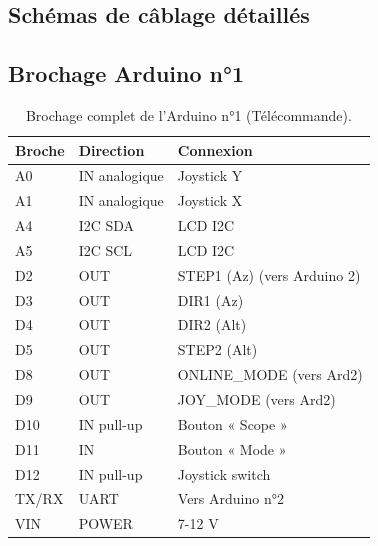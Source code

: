 \documentclass[12pt,a4paper]{report}
\begin{document}
\begin{enumerate}
\begin{enumerate}
\clearpage

\chapter{Schémas de câblage détaillés}

\section{Brochage Arduino n°1}
\begin{table}[H]
    \centering
    \caption{Brochage complet de l'Arduino n°1 (Télécommande).}
    \begin{tabular}{|l|l|l|}
        \hline
        \textbf{Broche} & \textbf{Direction} & \textbf{Connexion} \\
        \hline
        A0 & IN analogique & Joystick Y \\
        A1 & IN analogique & Joystick X \\
        A4 & I2C SDA & LCD I2C \\
        A5 & I2C SCL & LCD I2C \\
        D2 & OUT & STEP1 (Az) (vers Arduino 2) \\
        D3 & OUT & DIR1 (Az) \\
        D4 & OUT & DIR2 (Alt) \\
        D5 & OUT & STEP2 (Alt) \\
        D8 & OUT & ONLINE\_MODE (vers Ard2) \\
        D9 & OUT & JOY\_MODE (vers Ard2) \\
        D10 & IN pull-up & Bouton « Scope » \\
        D11 & IN & Bouton « Mode » \\
        D12 & IN pull-up & Joystick switch \\
        TX/RX & UART & Vers Arduino n°2 \\
        VIN & POWER & 7-12 V \\
        \hline
    \end{tabular}
\end{table}


\end{enumerate}
\end{enumerate}
\end{document}
